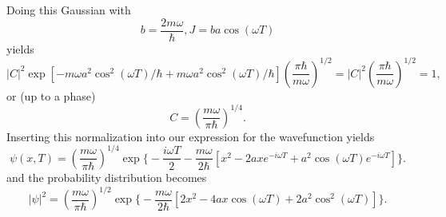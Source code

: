 Doing this Gaussian with 
\begin{equation}
    b=\frac{2m\omega}\hbar, J=ba\cos(\omega T)
\end{equation}
yields 
\begin{equation}
    |C|^2\exp[-m\omega a^2\cos^2(\omega T)/\hbar+m\omega a^2\cos^2(\omega T)/\hbar]\left (\frac{\pi\hbar}{m\omega}\right)^{1/2}=|C|^2\left (\frac{\pi\hbar}{m\omega}\right)^{1/2}=1,
\end{equation}
or (up to a phase)
\begin{equation}
    C=\left(\frac{m\omega}{\pi\hbar}\right)^{1/4}.
\end{equation}
Inserting this normalization into our expression for the wavefunction yields
\begin{equation}
    \psi(x,T)=\left(\frac{m\omega}{\pi\hbar}\right)^{1/4}\exp \Bigg \{ -\frac{i\omega T}2-\frac{m\omega}{2\hbar}[x^2-2axe^{-i\omega T}+a^2\cos(\omega T)e^{-i\omega T}]\Bigg\}.
\end{equation}
and the probability distribution becomes
\begin{equation}
    |\psi|^2=\left(\frac{m\omega}{\pi\hbar}\right)^{1/2}\exp \Bigg \{ -\frac{m\omega}{2\hbar}[2x^2-4ax\cos(\omega T)+2a^2\cos^2(\omega T)]\Bigg\}.
\end{equation}


